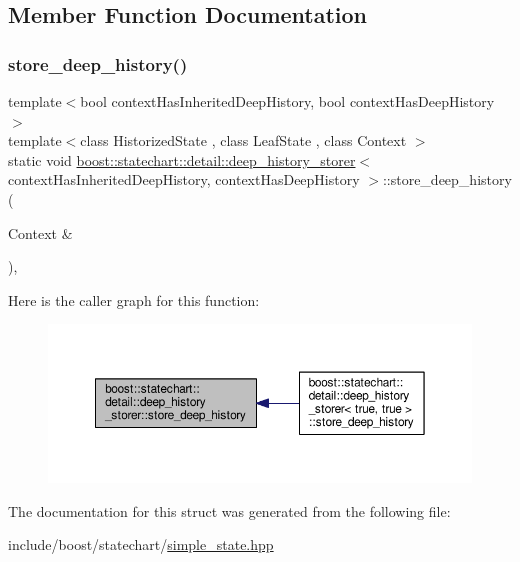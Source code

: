 \subsection{Member Function Documentation}
\mbox{\label{structboost_1_1statechart_1_1detail_1_1deep__history__storer_aca49f91b83e8b635b55760b6b29d0c3d}} 
\subsubsection{\texorpdfstring{store\+\_\+deep\+\_\+history()}{store\_deep\_history()}}
{\footnotesize\ttfamily template$<$bool context\+Has\+Inherited\+Deep\+History, bool context\+Has\+Deep\+History$>$ \\
template$<$class Historized\+State , class Leaf\+State , class Context $>$ \\
static void \mbox{\hyperlink{structboost_1_1statechart_1_1detail_1_1deep__history__storer}{boost\+::statechart\+::detail\+::deep\+\_\+history\+\_\+storer}}$<$ context\+Has\+Inherited\+Deep\+History, context\+Has\+Deep\+History $>$\+::store\+\_\+deep\+\_\+history (\begin{DoxyParamCaption}\item[{Context \&}]{ }\end{DoxyParamCaption})\hspace{0.3cm}{\ttfamily [inline]}, {\ttfamily [static]}}

Here is the caller graph for this function\+:
\nopagebreak
\begin{figure}[H]
\begin{center}
\leavevmode
\includegraphics[width=350pt]{structboost_1_1statechart_1_1detail_1_1deep__history__storer_aca49f91b83e8b635b55760b6b29d0c3d_icgraph}
\end{center}
\end{figure}


The documentation for this struct was generated from the following file\+:\begin{DoxyCompactItemize}
\item 
include/boost/statechart/\mbox{\hyperlink{simple__state_8hpp}{simple\+\_\+state.\+hpp}}\end{DoxyCompactItemize}
